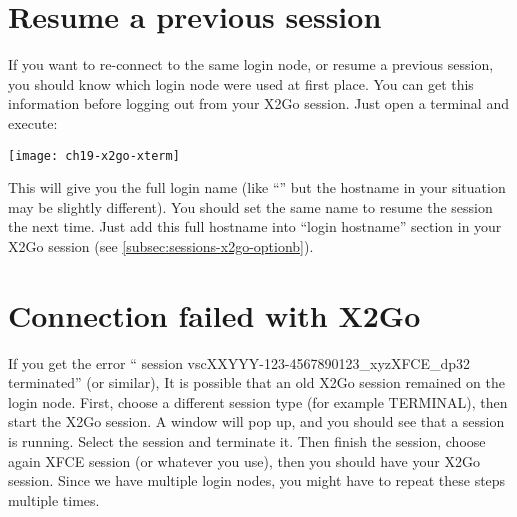 \section{Resume a previous session}
\label{sec:re-connect-x2go}

If you want to re-connect to the same login node, or resume a previous session, you should know which login node were used at first place.
You can get this information before logging out from your X2Go session. Just open a terminal and execute: 

\begin{prompt}
\end{prompt}

\texttt{[image: ch19-x2go-xterm]}

This will give you the full login name (like ``\strong{\emph{\loginhost{}}}'' but the hostname in your situation may be slightly different).
You should set the same name to resume the  session the next time.
Just add this full hostname into ``login hostname'' section in your X2Go session (see \autoref{subsec:sessions-x2go-optionb}).

\section{Connection failed with X2Go}
\label{sec:conn-fail-x2go}

If you get the error `` session vscXXYYY-123-4567890123\_xyzXFCE\_dp32 terminated'' (or similar),
It is possible that an old X2Go session remained on the login node.
First, choose a different session type (for example TERMINAL), then start the X2Go session.
A window will pop up, and you should see that a session is running. Select the session and terminate it.
Then finish the session, choose again XFCE session (or whatever you use), then you should have your X2Go session.
Since we have multiple login nodes, you might have to repeat these steps multiple times.
